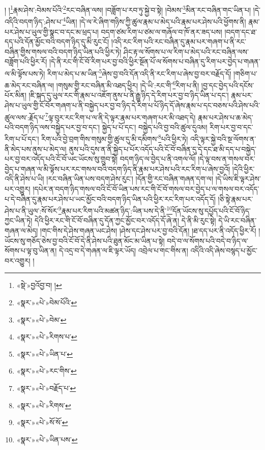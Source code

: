 ། །\footnote{«སྡེ་»བྱའོབྱ་བ། །}རྣམ་ཤེས་:བེམས་པོའི་\footnote{«སྣར་»«པེ་»བེམ་པོའི་}རང་བཞིན་ལས། །བཟློག་པ་རབ་ཏུ་སྐྱེ་བ་སྟེ། །བེམས་\footnote{«སྣར་»«པེ་»བེམ་}མིན་རང་བཞིན་གང་ཡིན་པ། །དེ་འདིའི་བདག་ཉིད་:ཤེས་པ་\footnote{«སྣར་»«པེ་»རིགས་པ་}ཡིན། །དེ་ལ་རེ་ཞིག་གཉིས་ཀྱི་ཚུལ་རྣམ་པ་མེད་པའི་རྣམ་པར་ཤེས་པའི་ཕྱོགས་ནི། རྣམ་པར་ཤེས་པ་ཡུལ་གྱི་སྣང་བ་དང་མ་ཕྲད་པ། བདག་ཙམ་རིག་པ་ཙམ་ལ་གཞོལ་བ་ཁོ་ནར་ཟད་པས། །བདག་དང་ཐ་དད་པའི་དོན་མྱོང་བའི་བདག་ཉིད་དུ་མི་རུང་ངོ། །འདི་རང་རིག་པའི་རང་བཞིན་དུ་རྣམ་པར་གཞག་པ་ནི་རང་བཞིན་གྱིས་གསལ་བའི་བདག་ཉིད་ཡིན་པའི་ཕྱིར་ཏེ། ཤིང་རྟ་ལ་སོགས་པ་ལ་རིག་པ་མེད་པའི་རང་བཞིན་ལས་བཟློག་པའི་ཕྱིར་རོ། །དེ་ནི་རང་གི་ངོ་བོ་རིག་པར་བྱ་བའི་ཕྱིར་སྔོན་པོ་ལ་སོགས་པ་བཞིན་དུ་རིག་པར་བྱེད་པ་གཞན་ལ་མི་ལྟོས་པས་ཏེ། རིག་པ་མེད་པ་མ་ཡིན་\footnote{«སྣར་»«པེ་»ཡིན་པ་}ཞེས་བྱ་བའི་དོན་འདི་ནི་རང་རིག་པ་ཞེས་བྱ་བར་བརྗོད་དོ། །གཅིག་པ་ཆ་མེད་རང་བཞིན་ལ། །གསུམ་གྱི་རང་བཞིན་མི་འཐད་ཕྱིར། །དེ་ཡི་:རང་གི་\footnote{«སྣར་»«པེ་»རང་གིས་}རིག་པ་ནི། །བྱ་དང་བྱེད་པའི་དངོས་པོར་མིན། །ཇི་སྐད་དུ་ཡུལ་རང་གི་རྣམ་པ་འཇོག་ནུས་པ་ནི་རྒྱུ་ཉིད་དེ་རིག་པར་བྱ་བ་ཉིད་ཡིན་པ་དང་། རྣམ་པར་ཤེས་པ་ཡུལ་གྱི་ངོ་བོར་གཞག་པ་ནི་བསྐྱེད་པར་བྱ་བ་ཉིད་དེ་རིག་པ་པོ་ཉིད་དོ་ཞེས་རྣམ་པ་དང་བཅས་པའི་ཤེས་པའི་ཚུལ་ལས་:རྗོད་པ་\footnote{«སྣར་»«པེ་»བརྗོད་པ་}ལྟ་བུར་རང་རིག་པ་ལ་ནི་དེ་ལྟར་རྣམ་པར་གཞག་པར་མི་འཐད་དེ། རྣམ་པར་ཤེས་པ་ཆ་མེད་པའི་བདག་ཉིད་ལས་བསྐྱེད་པར་བྱ་བ་དང་། སྐྱེད་པ་པོ་དང་། བསྐྱེད་པའི་བྱ་བའི་ཚུལ་དུའམ། རིག་པར་བྱ་བ་དང་རིག་པ་པོ་དང་། རིག་པའི་བྱེ་བྲག་གིས་གསུམ་གྱི་ཚུལ་དུ་མི་དམིགས་\footnote{«སྣར་»«པེ་»རིགས་}པའི་ཕྱིར་ཏེ། འདི་ལྟར་སྐྱེ་བའི་སྔ་ལོགས་ན་ནི་མེད་པས་ནུས་པ་མེད་ལ། ནུས་པའི་དུས་ན་ནི་སྐྱེད་པ་པོར་འདོད་པའི་ངོ་བོ་བཞིན་དུ་དེ་དང་ཐ་མི་དད་པ་བསྐྱེད་པར་བྱ་བར་འདོད་པའི་ངོ་བོ་ཡང་ཡོངས་སུ་གྲུབ་སྟེ། བདག་ཉིད་ལ་བྱེད་པ་ནི་འགལ་ལོ། །དེ་ལྟ་བས་ན་གསལ་བར་བྱེད་པ་གཞན་ལ་མི་ལྟོས་པར་རང་གསལ་བའི་བདག་ཉིད་ནི་རྣམ་པར་ཤེས་པའི་རང་རིག་པ་ཞེས་བྱའོ། །དེའི་ཕྱིར་འདི་ནི་ཤེས་པ་ཡི། །རང་བཞིན་ཡིན་པས་བདག་ཤེས་རུང་། །དོན་གྱི་རང་བཞིན་གཞན་དག་ལ། །དེ་ཡིས་ཇི་ལྟར་ཤེས་པར་འགྱུར། །དཔེར་ན་བདག་ཉིད་གསལ་བའི་ངོ་བོ་ཡིན་པས་རང་གི་ངོ་བོ་གསལ་བར་བྱེད་པ་ལ་གསལ་བར་འདོད་པ་དེ་བཞིན་དུ་རྣམ་པར་ཤེས་པ་ཡང་མྱོང་བའི་བདག་ཉིད་ཡིན་པའི་ཕྱིར་རང་རིག་པར་འདོད་དོ། །ཅི་སྟེ་རྣམ་པར་ཤེས་པ་ནི་ཡུལ་:སོ་སོར་\footnote{«སྣར་»«པེ་»སོ་སོ་}རྣམ་པར་རིག་པའི་མཚན་ཉིད་:ཡིན་པས་དེ་ནི་\footnote{«སྣར་»«པེ་»ཡིན་པས་}དོན་ཡོངས་སུ་དཔྱོད་པའི་ངོ་བོ་ཉིད་ཀྱང་ཡིན་ཏེ། དེའི་ཕྱིར་རང་གི་ངོ་བོ་བཞིན་དུ་དོན་ཀྱང་མྱོང་བར་འདོད་དོ་ཞེ་ན། དེ་ནི་མི་རུང་སྟེ། དེ་ཡི་རང་བཞིན་གཞན་ལ་མེད། །གང་གིས་དེ་ཤེས་གཞན་ཡང་ཤེས། །ཤེས་དང་ཤེས་པར་བྱ་བའི་དོན། །ཐ་དད་པར་ནི་འདོད་ཕྱིར་རོ། །ཡོངས་སུ་གཅོད་ཅེས་བྱ་བའི་ངོ་བོ་དེ་ནི་ཤེས་པའི་ཐུན་མོང་མ་ཡིན་པ་སྟེ། བདེ་བ་ལ་སོགས་པའི་བདེ་བ་ཉིད་ལ་སོགས་པ་ལྟ་བུ་ཡིན་ན། དེ་འདྲ་བ་དེ་གཞན་ལ་ཇི་ལྟར་ཡོད། འབྲེལ་པ་གང་གིས་ན། འདིའི་འདི་ཞེས་བསྙད་པ་མྱོང་བར་འགྱུར། །
